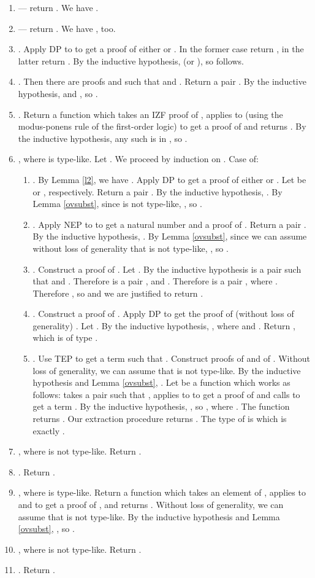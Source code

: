 \documentclass{LMCS}
\begin{document}
\begin{enumerate}[]
\item  --- return . We have .
\item  --- return . We have , too. 
\item . Apply DP to  to get a proof  of either
 or . In the former case return , in the latter
return . By the inductive hypothesis,  (or
), so  follows. 
\item . Then there are proofs  and  such that
 and . Return a pair . By the inductive hypothesis,  and
, so
. 
\item . Return a function  which takes an IZF proof
 of , applies  to  (using the modus-ponens rule of the first-order logic) to get a proof
 of  and returns . By the inductive hypothesis, any
such 
is in , so .
\item , where  is type-like. Let .
We proceed by induction on . Case  of:
\begin{enumerate}[]
\item . By Lemma \ref{l2}, we have . Apply DP to
get a proof  of either  or . Let  be  or ,
respectively. Return a pair . By the inductive hypothesis,
. By Lemma \ref{ovsubst}, since  is not
type-like, , so
.
\item . Apply NEP to  to get a natural number  and a proof
 of . Return a pair . By the inductive hypothesis,
. By Lemma \ref{ovsubst}, since we can
assume without loss of generality that  is not type-like, , so . 
\item . Construct a proof  of . Let .
By the inductive hypothesis  is a pair  such that 
and .
Therefore  is a pair ,  and
. Therefore  is a pair
, where . Therefore , so  and we
are justified to return . 
\item . Construct a proof  of . Apply DP to get
the proof  of (without loss of generality) . Let . By the inductive hypothesis, , where  and . Return , which is of type . 
\item . Use TEP to get a term  such that . Construct proofs  of  and  of
. Without loss of generality, we can assume that  is not
type-like. By the inductive hypothesis and Lemma \ref{ovsubst}, . Let  be a function which works as follows:  takes a pair
 such 
that , applies  to  to get a
proof  of  and calls
 to get a term . By the inductive
hypothesis, , so ,
where . The function  returns . Our extraction procedure
 returns . The type of  is
 which is exactly .
\end{enumerate}
\item , where  is not type-like. Return . 
\item . Return .
\item , where  is type-like. Return a function 
which takes an element  of , applies  to
 and  to get a proof  of , and returns . Without loss of
generality, we can assume that  is not type-like. By the inductive hypothesis and
Lemma \ref{ovsubst}, , so .
\item , where  is not type-like. Return .
\item . Return . 
\end{enumerate}
\end{document}
